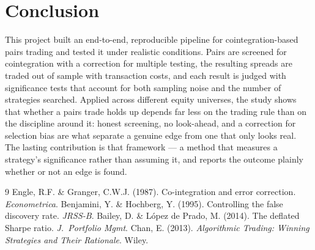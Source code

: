 \documentclass[11pt]{article}
\begin{document}
\section{Conclusion}
This project built an end-to-end, reproducible pipeline for cointegration-based pairs trading and tested
it under realistic conditions. Pairs are screened for cointegration with a correction for multiple
testing, the resulting spreads are traded out of sample with transaction costs, and each result is judged
with significance tests that account for both sampling noise and the number of strategies searched.
Applied across different equity universes, the study shows that whether a pairs trade holds up depends
far less on the trading rule than on the discipline around it: honest screening, no look-ahead, and a
correction for selection bias are what separate a genuine edge from one that only looks real. The lasting
contribution is that framework --- a method that measures a strategy's significance rather than assuming
it, and reports the outcome plainly whether or not an edge is found.

\begin{thebibliography}{9}
\small
{} Engle, R.F. \& Granger, C.W.J. (1987). Co-integration and error correction. \emph{Econometrica}.
 Benjamini, Y. \& Hochberg, Y. (1995). Controlling the false discovery rate. \emph{JRSS-B}.
 Bailey, D. \& L\'opez de Prado, M. (2014). The deflated Sharpe ratio. \emph{J.\ Portfolio Mgmt}.
 Chan, E. (2013). \emph{Algorithmic Trading: Winning Strategies and Their Rationale}. Wiley.
\end{thebibliography}
\end{document}

